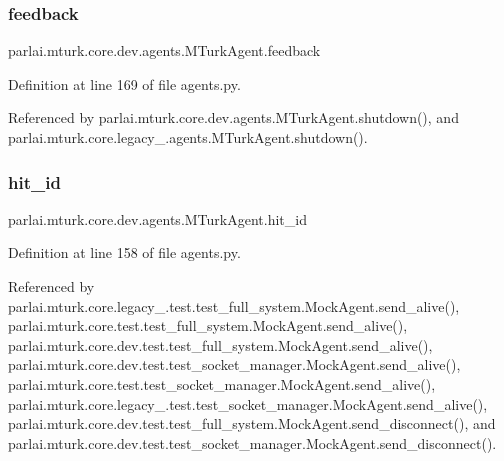 \subsubsection{\texorpdfstring{feedback}{feedback}}
{\footnotesize\ttfamily parlai.\+mturk.\+core.\+dev.\+agents.\+M\+Turk\+Agent.\+feedback}



Definition at line 169 of file agents.\+py.



Referenced by parlai.\+mturk.\+core.\+dev.\+agents.\+M\+Turk\+Agent.\+shutdown(), and parlai.\+mturk.\+core.\+legacy\+\_.\+agents.\+M\+Turk\+Agent.\+shutdown().

\mbox{\label{classparlai_1_1mturk_1_1core_1_1dev_1_1agents_1_1MTurkAgent_a0c4bc04bc9580f459a7fce557617de3d}} 
\subsubsection{\texorpdfstring{hit\+\_\+id}{hit\_id}}
{\footnotesize\ttfamily parlai.\+mturk.\+core.\+dev.\+agents.\+M\+Turk\+Agent.\+hit\+\_\+id}



Definition at line 158 of file agents.\+py.



Referenced by parlai.\+mturk.\+core.\+legacy\+\_.\+test.\+test\+\_\+full\+\_\+system.\+Mock\+Agent.\+send\+\_\+alive(), parlai.\+mturk.\+core.\+test.\+test\+\_\+full\+\_\+system.\+Mock\+Agent.\+send\+\_\+alive(), parlai.\+mturk.\+core.\+dev.\+test.\+test\+\_\+full\+\_\+system.\+Mock\+Agent.\+send\+\_\+alive(), parlai.\+mturk.\+core.\+dev.\+test.\+test\+\_\+socket\+\_\+manager.\+Mock\+Agent.\+send\+\_\+alive(), parlai.\+mturk.\+core.\+test.\+test\+\_\+socket\+\_\+manager.\+Mock\+Agent.\+send\+\_\+alive(), parlai.\+mturk.\+core.\+legacy\+\_.\+test.\+test\+\_\+socket\+\_\+manager.\+Mock\+Agent.\+send\+\_\+alive(), parlai.\+mturk.\+core.\+dev.\+test.\+test\+\_\+full\+\_\+system.\+Mock\+Agent.\+send\+\_\+disconnect(), and parlai.\+mturk.\+core.\+dev.\+test.\+test\+\_\+socket\+\_\+manager.\+Mock\+Agent.\+send\+\_\+disconnect().


